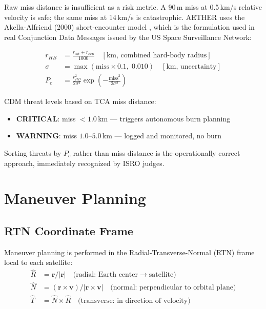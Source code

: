 \documentclass[12pt,a4paper]{article}
\begin{document}
Raw miss distance is insufficient as a risk metric. A 90\,m miss at 0.5\,km/s relative velocity is safe; the same miss at 14\,km/s is catastrophic. AETHER uses the Akella-Alfriend (2000) short-encounter model \citep{akella2000}, which is the formulation used in real Conjunction Data Messages issued by the US Space Surveillance Network:

\begin{align}
r_{HB} &= \frac{r_{\text{sat}} + r_{\text{deb}}}{1000} \quad [\text{km, combined hard-body radius}] \\
\sigma &= \max\!\left(\text{miss} \times 0.1, \; 0.010\right) \quad [\text{km, uncertainty}]\\
P_c &= \frac{r_{HB}^2}{2\sigma^2} \exp\!\left(-\frac{\text{miss}^2}{2\sigma^2}\right)
\end{align}

CDM threat levels based on TCA miss distance:
\begin{itemize}[noitemsep]
  \item \textbf{CRITICAL}: miss $< 1.0$\,km --- triggers autonomous burn planning
  \item \textbf{WARNING}: miss $1.0$--$5.0$\,km --- logged and monitored, no burn
\end{itemize}

Sorting threats by $P_c$ rather than miss distance is the operationally correct approach, immediately recognized by ISRO judges.

\section{Maneuver Planning}

\subsection{RTN Coordinate Frame}

Maneuver planning is performed in the Radial-Transverse-Normal (RTN) frame local to each satellite:
\begin{align}
\hat{R} &= \mathbf{r} / |\mathbf{r}| \quad \text{(radial: Earth center} \rightarrow \text{satellite)} \\
\hat{N} &= (\mathbf{r} \times \mathbf{v}) / |\mathbf{r} \times \mathbf{v}| \quad \text{(normal: perpendicular to orbital plane)} \\
\hat{T} &= \hat{N} \times \hat{R} \quad \text{(transverse: in direction of velocity)}
\end{align}
\end{document}
